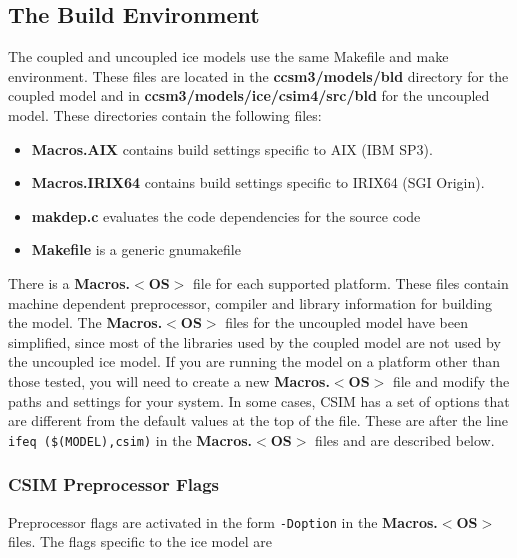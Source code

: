 
\subsection{The Build Environment}

The coupled and uncoupled ice models use the same Makefile and make environment.
These files are located in the {\bf ccsm3/models/bld} directory for the coupled
model and in {\bf ccsm3/models/ice/csim4/src/bld} for the uncoupled model.
These directories contain the following files:

\begin{itemize}
\item  {\bf Macros.AIX} contains build settings specific to AIX (IBM SP3).
\item  {\bf Macros.IRIX64} contains build settings specific to IRIX64 (SGI Origin).
\item  {\bf makdep.c} evaluates the code dependencies for the source code
\item  {\bf Makefile} is a generic gnumakefile
\end{itemize}

There is a {\bf Macros.$<$OS$>$} file for each supported platform. These files contain
machine dependent preprocessor, compiler and library information for building the model.
The {\bf Macros.$<$OS$>$} files for the uncoupled model have been simplified, since most of
the libraries used by the coupled model are not used by the uncoupled ice model. 
If you are running the model on a platform other than those tested, you
will need to create a new {\bf Macros.$<$OS$>$} file and modify the paths and settings
for your system.  In some cases, CSIM has a set of options that are different from
the default values at the top of the file.  These are after the line
{\tt ifeq (\$(MODEL),csim)} in the {\bf Macros.$<$OS$>$} files and are described below.

\subsubsection{CSIM Preprocessor Flags}

Preprocessor flags are activated in the form {\tt -Doption} in the {\bf Macros.$<$OS$>$}
files.  The flags specific to the ice model are

